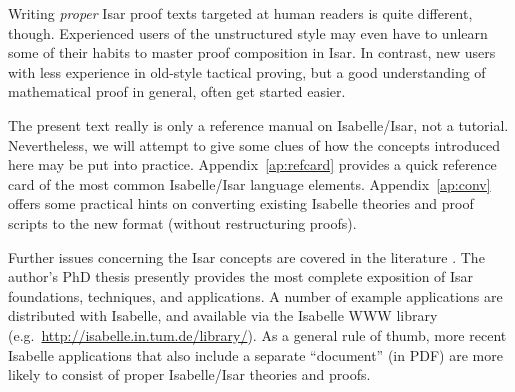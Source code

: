 Writing \emph{proper} Isar proof texts targeted at human readers is quite
different, though.  Experienced users of the unstructured style may even have
to unlearn some of their habits to master proof composition in Isar.  In
contrast, new users with less experience in old-style tactical proving, but a
good understanding of mathematical proof in general, often get started easier.

\medskip The present text really is only a reference manual on Isabelle/Isar,
not a tutorial.  Nevertheless, we will attempt to give some clues of how the
concepts introduced here may be put into practice.  Appendix~\ref{ap:refcard}
provides a quick reference card of the most common Isabelle/Isar language
elements.  Appendix~\ref{ap:conv} offers some practical hints on converting
existing Isabelle theories and proof scripts to the new format (without
restructuring proofs).

Further issues concerning the Isar concepts are covered in the literature
\cite{Wenzel:1999:TPHOL,Wiedijk:2000:MV,Bauer-Wenzel:2000:HB,Bauer-Wenzel:2001}.
The author's PhD thesis \cite{Wenzel-PhD} presently provides the most complete
exposition of Isar foundations, techniques, and applications.  A number of
example applications are distributed with Isabelle, and available via the
Isabelle WWW library (e.g.\ \url{http://isabelle.in.tum.de/library/}).  As a
general rule of thumb, more recent Isabelle applications that also include a
separate ``document'' (in PDF) are more likely to consist of proper
Isabelle/Isar theories and proofs.

  
